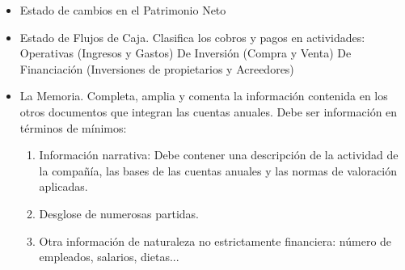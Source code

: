 \begin{itemize}
    \paragraph{Amortización.} Los bienes de equipo (las inversiones) van perdiendo valor conforme van colaborando en el proceso productivo, incluso por el mero transcurso del tiempo. Se designa por depreciación a esa perdida de valor que experimentan los equipos industrailes o cualquier otro elemento del activo. 
    Al calcular los costes de producción industrial, además de la mano de obra, metrias primas, energía, debemos incluir otros que solo pueden ser expresados de forma indirecta, como la depreciación de las maquinas que se han utilizado para la obtención de los productos. SOn los llamados costes indirectos, donde no existe certeza de imputación a cada producto.
    Denominamos amortización a la imputación de la depreciación al coste de la producción industrial.
    Funciones que cumple la amortización:
    \begin{enumerate}
        \item Función contable: permite reflejar contablemente la perdida de valor de los elementos del activo fijo.
        \item Función económica: a través de la amortización se imputa a los costes de producción un consumo mas, que es el consumo de activo o capital fijo.
        \item Función financiera: Mientras que la capacidad productiva de la empresa se mantiene aproximadamente igual a lo largo de su vida útil, se van acumulando las cuotas de amortización, que la empresa utiliza para hacer frente a sus necesidades financieras.
    \end{enumerate}
    \item Estado de cambios en el Patrimonio Neto
    \item Estado de Flujos de Caja. Clasifica los cobros y pagos en actividades:
    \subitem Operativas (Ingresos y Gastos)
    \subitem De Inversión (Compra y Venta)
    \subitem De Financiación (Inversiones de propietarios y Acreedores)
    \item La Memoria. Completa, amplia y comenta la información contenida en los otros documentos que integran las cuentas anuales. Debe ser información en términos de mínimos:
    \begin{enumerate}
        \item Información narrativa: Debe contener una descripción de la actividad de la compañía, las bases de las cuentas anuales y las normas de valoración aplicadas.
        \item Desglose de numerosas partidas.
        \item Otra información de naturaleza no estrictamente financiera: número de empleados, salarios, dietas...
    \end{enumerate}
\end{itemize}